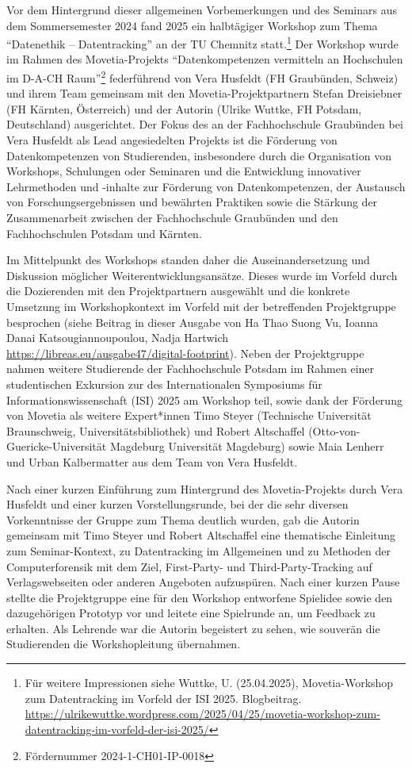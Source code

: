 \documentclass[a4paper,
fontsize=11pt,
oneside,
numbers=noperiodatend,
parskip=half-,
bibliography=totoc,
final
]{scrartcl}
\begin{document}
Vor dem Hintergrund dieser allgemeinen Vorbemerkungen und des Seminars
aus dem Sommersemester 2024 fand 2025 ein halbtägiger Workshop zum Thema
\enquote{Datenethik -- Datentracking} an der TU Chemnitz
statt.\footnote{Für weitere Impressionen siehe Wuttke, U. (25.04.2025),
  Movetia-Workshop zum Datentracking im Vorfeld der ISI 2025.
  Blogbeitrag.
  \url{https://ulrikewuttke.wordpress.com/2025/04/25/movetia-workshop-zum-datentracking-im-vorfeld-der-isi-2025/}}
Der Workshop wurde im Rahmen des Movetia-Projekts \enquote{Datenkompetenzen
vermitteln an Hochschulen im D-A-CH Raum}\footnote{Fördernummer
  2024-1-CH01-IP-0018} federführend von Vera Husfeldt (FH Graubünden,
Schweiz) und ihrem Team gemeinsam mit den Movetia-Projektpartnern Stefan
Dreisiebner (FH Kärnten, Österreich) und der Autorin (Ulrike Wuttke, FH
Potsdam, Deutschland) ausgerichtet. Der Fokus des an der Fachhochschule Graubünden bei Vera Husfeldt als Lead angesiedelten Projekts ist die
Förderung von Datenkompetenzen von Studierenden, insbesondere durch die
Organisation von Workshops, Schulungen oder Seminaren und die
Entwicklung innovativer Lehrmethoden und -inhalte zur Förderung von
Datenkompetenzen, der Austausch von Forschungsergebnissen und bewährten
Praktiken sowie die Stärkung der Zusammenarbeit zwischen der
Fachhochschule Graubünden und den Fachhochschulen Potsdam und Kärnten.

Im Mittelpunkt des Workshops standen daher die Auseinandersetzung und
Diskussion möglicher Weiterentwicklungsansätze. Dieses wurde im Vorfeld
durch die Dozierenden mit den Projektpartnern ausgewählt und die
konkrete Umsetzung im Workshopkontext im Vorfeld mit der betreffenden
Projektgruppe besprochen (siehe Beitrag in dieser Ausgabe von Ha Thao
Suong Vu, Ioanna Danai Katsougiannoupoulou, Nadja Hartwich \url{https://libreas.eu/ausgabe47/digital-footprint}). Neben der
Projektgruppe nahmen weitere Studierende der Fachhochschule Potsdam im
Rahmen einer studentischen Exkursion zur des Internationalen Symposiums
für Informationswissenschaft (ISI) 2025 am Workshop teil, sowie dank der
Förderung von Movetia als weitere Expert*innen Timo Steyer (Technische
Universität Braunschweig, Universitätsbibliothek) und Robert Altschaffel
(Otto-von-Guericke-Universität Magdeburg Universität Magdeburg) sowie
Maia Lenherr und Urban Kalbermatter aus dem Team von Vera Husfeldt.

Nach einer kurzen Einführung zum Hintergrund des Movetia-Projekts durch
Vera Husfeldt und einer kurzen Vorstellungsrunde, bei der die sehr
diversen Vorkenntnisse der Gruppe zum Thema deutlich wurden, gab die
Autorin gemeinsam mit Timo Steyer und Robert Altschaffel eine
thematische Einleitung zum Seminar-Kontext, zu Datentracking im
Allgemeinen und zu Methoden der Computerforensik mit dem Ziel,
First-Party- und Third-Party-Tracking auf Verlagswebseiten oder anderen
Angeboten aufzuspüren. Nach einer kurzen Pause stellte die Projektgruppe
eine für den Workshop entworfene Spielidee sowie den dazugehörigen
Prototyp vor und leitete eine Spielrunde an, um Feedback zu erhalten.
Als Lehrende war die Autorin begeistert zu sehen, wie souverän die
Studierenden die Workshopleitung übernahmen.
\end{document}
